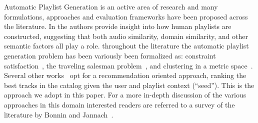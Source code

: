 






%
%

Automatic Playlist Generation is an active area of research and many formulations, approaches and evaluation frameworks have been proposed across the literature. In \cite{Cunningham:06} the authors provide insight into how human playlists are constructed, suggesting that both audio similarity, domain similarity, and other semantic factors all play a role. throughout the literature the automatic playlist generation problem has been variously been formalized as:  constraint satisfaction~\cite{Pauws2008647}, the traveling salesman problem~\cite{Knees:2006}, and clustering in a metric space~\cite{Pauws:ISMIR02}. Several other works~\cite{Hariri:2012, Jannach:2015,a2mf} opt for a recommendation oriented approach, ranking the best tracks in the catalog given the user and playlist context (``seed''). This is the approach we adopt in this paper. For a more in-depth discussion of the various approaches in this domain interested readers are referred to a survey of the literature by Bonnin and Jannach~\cite{playlist_survey}.

